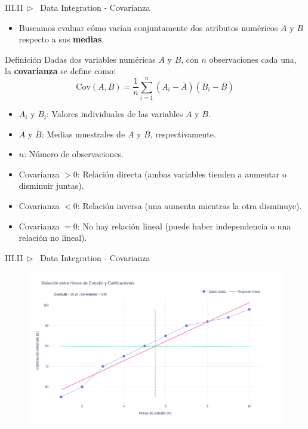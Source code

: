 \documentclass[xcolor=dvipsnames]{beamer}
\begin{document}
    \begin{frame}{III.II~$\rhd$~ Data Integration - Covarianza}
    \scriptsize{
        \begin{itemize}
            \item Buscamos evaluar cómo varían conjuntamente dos atributos numéricos $A$ y $B$ respecto a sus \textbf{medias}.
        \end{itemize}
        \begin{block}{Definición}
            Dadas dos variables numéricas \( A \) y \( B \), con \( n \) observaciones cada una, la \textbf{covarianza} se define como:
            \[
            \text{Cov}(A, B) = \frac{1}{n} \sum_{i=1}^{n} (A_i - \bar{A})(B_i - \bar{B})
            \]
        
            \begin{itemize}
                \item \( A_i \) y \( B_i \): Valores individuales de las variables \( A \) y \( B \).
                \item \( \bar{A} \) y \( \bar{B} \): Medias muestrales de \( A \) y \( B \), respectivamente.
                \item \( n \): Número de observaciones.
            \end{itemize}
        \end{block}
        \begin{itemize}
            \item Covarianza \( > 0 \): Relación directa (ambas variables tienden a aumentar o disminuir juntas).
            \item Covarianza \( < 0 \): Relación inversa (una aumenta mientras la otra disminuye).
            \item Covarianza \( = 0 \): No hay relación lineal (puede haber independencia o una relación no lineal).
        \end{itemize}
    }
    \end{frame}

    \begin{frame}{III.II~$\rhd$~ Data Integration - Covarianza}
        \begin{figure}
            \centering
            \includegraphics[width=\linewidth]{imgs/corr/ej2.png}
        \end{figure}
    \end{frame}
\end{document}
